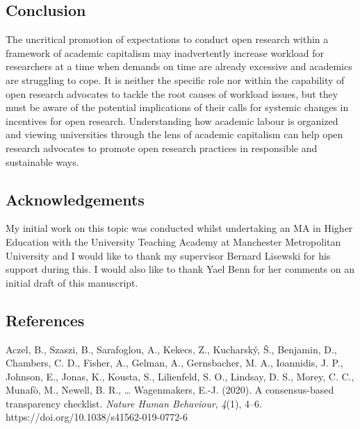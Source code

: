 \documentclass[meta, authordate]{jote-new-article}
\begin{document}
\subsection{Conclusion}



The uncritical promotion of expectations to conduct open research within a framework of academic capitalism may inadvertently increase workload for researchers at a time when demands on time are already excessive and academics are struggling to cope. It is neither the specific role nor within the capability of open research advocates to tackle the root causes of workload issues, but they must be aware of the potential implications of their calls for systemic changes in incentives for open research. Understanding how academic labour is organized and viewing universities through the lens of academic capitalism can help open research advocates to promote open research practices in responsible and sustainable ways.



\subsection{Acknowledgements}



My initial work on this topic was conducted whilst undertaking an MA in Higher Education with the University Teaching Academy at Manchester Metropolitan University and I would like to thank my supervisor Bernard Lisewski for his support during this. I would also like to thank Yael Benn for her comments on an initial draft of this manuscript.











\subsection{References}



Aczel, B., Szaszi, B., Sarafoglou, A., Kekecs, Z., Kucharský, Š., Benjamin, D., Chambers, C. D., Fisher, A., Gelman, A., Gernsbacher, M. A., Ioannidis, J. P., Johnson, E., Jonas, K., Kousta, S., Lilienfeld, S. O., Lindsay, D. S., Morey, C. C., Munafò, M., Newell, B. R., … Wagenmakers, E.-J. (2020). A consensus-based transparency checklist. \emph{Nature Human Behaviour}, \emph{4}(1), 4–6. https://doi.org/10.1038/s41562-019-0772-6
\end{document}

